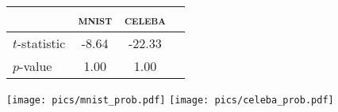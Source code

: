  


\begin{SCtable}[0.7][t]
    \centering
    \begin{tabular}{lccc}
    \toprule
    & \textsc{mnist} & \textsc{celeba} \\ 
    \midrule
    $t$-statistic    & -8.64 & -22.33 \\ 
    $p$-value        & 1.00  & 1.00  \\ 
    \bottomrule
    \end{tabular}
    \caption{One-sided Student's $t$-test for the variability of geodesic versus Euclidean distances} %
    \label{tab:t_tests}
\end{SCtable}


\begin{SCfigure*}[5][t]
        \texttt{[image: pics/mnist\_prob.pdf]}
        \texttt{[image: pics/celeba\_prob.pdf]}
    \caption{Histograms of coefficients of variation for Euclidean and geodesic distances on \textsc{mnist} (left) and \textsc{celeba} (right). Geodesic distances vary significantly less, which is quantified in Table~\ref{tab:t_tests}.}
    \label{fig:histogram-mnist-celeba}
\end{SCfigure*}